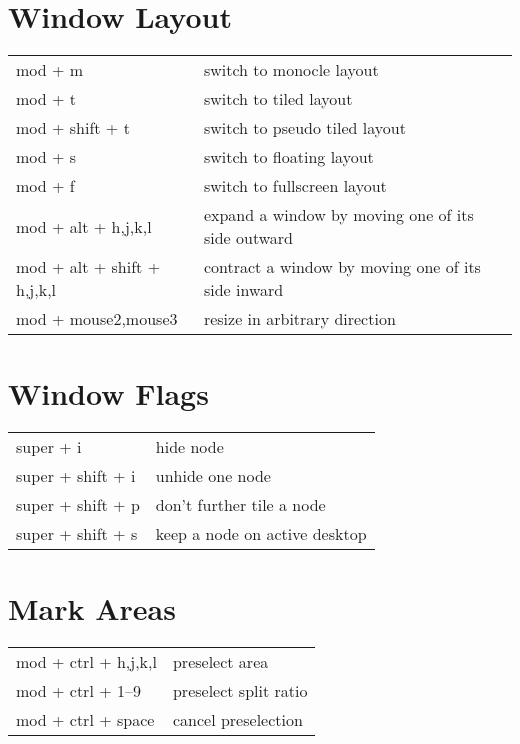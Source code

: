 \documentclass[
    10pt,
    a4paper,
    notitlepage,
]{scrartcl}
\begin{document}
\section{Window Layout}
\begin{tabular}{p{4cm}l}
    mod + m             & switch to monocle layout              \\
    mod + t             & switch to tiled layout                \\
    mod + shift + t     & switch to pseudo tiled layout         \\
    mod + s             & switch to floating layout             \\
    mod + f             & switch to fullscreen layout           \\
    mod + alt + h,j,k,l   & expand a window by moving one of its side outward        \\
    mod + alt + shift + h,j,k,l & contract a window by moving one of its side inward \\
    mod + mouse2,mouse3   & resize in arbitrary direction
\end{tabular}

\section{Window Flags}
\begin{tabular}{p{4cm}l}
    super + i           & hide node                         \\
    super + shift + i   & unhide one node                   \\
    super + shift + p   & don't further tile a node         \\
    super + shift + s   & keep a node on active desktop
\end{tabular}

\section{Mark Areas}
\begin{tabular}{p{4cm}l}
    mod + ctrl + h,j,k,l  & preselect area                    \\
    mod + ctrl + 1--9     & preselect split ratio             \\
    mod + ctrl + space    & cancel preselection
\end{tabular}
\end{document}
